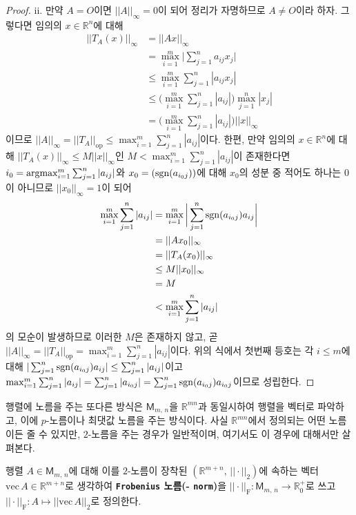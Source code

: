 \begin{proof}
    ii. 만약 $A=O$이면 $||A||_\infty=0$이 되어 정리가 자명하므로 $A\ne O$이라 하자. 그렇다면 임의의 $x\in\mathbb{R}^n$에 대해
    \begin{align*}
        ||T_A(x)||_\infty&=||Ax||_\infty\\
        &=\max_{i=1}^m\bigg|\sum_{j=1}^na_{ij}x_j\bigg|\\
        &\leq\max_{i=1}^m\sum_{j=1}^n|a_{ij}x_j|\\
        &\leq\bigg(\max_{i=1}^m\sum_{j=1}^n|a_{ij}|\bigg)\max_{j=1}^n|x_j|\\
        &=\bigg(\max_{i=1}^m\sum_{j=1}^n|a_{ij}|\bigg)||x||_\infty
    \end{align*}
    이므로 $||A||_\infty=||T_A||_\mathrm{op}\leq\max_{i=1}^m\sum_{j=1}^n|a_{ij}|$이다. 한편, 만약 임의의 $x\in\mathbb{R}^n$에 대해 $||T_A(x)||_\infty\leq M||x||_\infty$인 $M<\max_{i=1}^m\sum_{j=1}^n|a_{ij}|$이 존재한다면 $i_0=\mathrm{argmax}_{i=1}^m\sum_{j=1}^n|a_{ij}|$와 $x_0=(\mathrm{sgn}(a_{i_0j}))$에 대해 $x_0$의 성분 중 적어도 하나는 $0$이 아니므로 $||x_0||_\infty=1$이 되어
    \begin{align*}
        \max_{i=1}^m\sum_{j=1}^n|a_{ij}|&=\max_{i=1}^m\bigg|\sum_{j=1}^n\mathrm{sgn}(a_{i_0j})a_{ij}\bigg|\\
        &=||Ax_0||_\infty\\
        &=||T_A(x_0)||_\infty\\
        &\leq M||x_0||_\infty\\
        &=M\\
        &<\max_{i=1}^m\sum_{j=1}^n|a_{ij}|
    \end{align*}
    의 모순이 발생하므로 이러한 $M$은 존재하지 않고, 곧 $||A||_\infty=||T_A||_\mathrm{op}=\max_{i=1}^m\sum_{j=1}^n|a_{ij}|$이다. 위의 식에서 첫번째 등호는 각 $i\leq m$에 대해 $|\sum_{j=1}^n\mathrm{sgn}(a_{i_0j})a_{ij}|\leq\sum_{j=1}^n|a_{ij}|$이고 $\max_{i=1}^m\sum_{j=1}^n|a_{ij}|=\sum_{j=1}^n|a_{i_0j}|=\sum_{j=1}^n\mathrm{sgn}(a_{i_0j})a_{i_0j}$이므로 성립한다.
\end{proof}

행렬에 노름을 주는 또다른 방식은 $\mathsf{M}_{m,\,n}$을 $\mathbb{R}^{mn}$과 동일시하여 행렬을 벡터로 파악하고, 이에 $p$-노름이나 최댓값 노름을 주는 방식이다. 사실 $\mathbb{R}^{mn}$에서 정의되는 어떤 노름이든 줄 수 있지만, $2$-노름을 주는 경우가 일반적이며, 여기서도 이 경우에 대해서만 살펴본다.

\begin{definition}
    행렬 $A\in\mathsf{M}_{m,\,n}$에 대해 이를 $2$-노름이 장착된 $(\mathbb{R}^{m+n},\,||\cdot||_2)$에 속하는 벡터 $\mathrm{vec}\,A\in\mathbb{R}^{m+n}$로 생각하여 \textbf{\texttt{Frobenius} 노름(- \texttt{norm})}을 $||\cdot||_\mathrm{F}:\mathsf{M}_{m,\,n}\to\mathbb{R}_0^+$로 쓰고 $||\cdot||_\mathrm{F}:A\mapsto||\mathrm{vec}\, A||_2$로 정의한다.
\end{definition}

